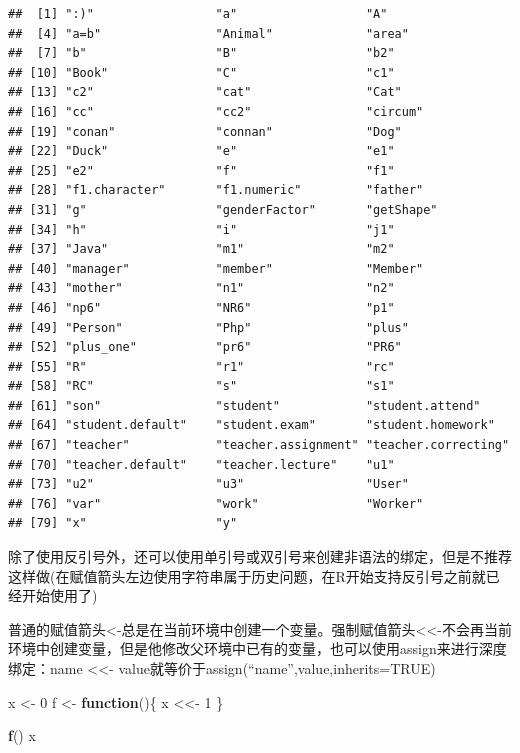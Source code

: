 \documentclass[]{book}
\newenvironment{Shaded}{\begin{snugshade}}{\end{snugshade}}
\newcommand{\KeywordTok}[1]{\textcolor[rgb]{0.13,0.29,0.53}{\textbf{#1}}}
\newcommand{\DecValTok}[1]{\textcolor[rgb]{0.00,0.00,0.81}{#1}}
\newcommand{\StringTok}[1]{\textcolor[rgb]{0.31,0.60,0.02}{#1}}
\newcommand{\ControlFlowTok}[1]{\textcolor[rgb]{0.13,0.29,0.53}{\textbf{#1}}}
\newcommand{\NormalTok}[1]{#1}
\begin{document}
\begin{verbatim}
##  [1] ":)"                 "a"                  "A"                 
##  [4] "a=b"                "Animal"             "area"              
##  [7] "b"                  "B"                  "b2"                
## [10] "Book"               "C"                  "c1"                
## [13] "c2"                 "cat"                "Cat"               
## [16] "cc"                 "cc2"                "circum"            
## [19] "conan"              "connan"             "Dog"               
## [22] "Duck"               "e"                  "e1"                
## [25] "e2"                 "f"                  "f1"                
## [28] "f1.character"       "f1.numeric"         "father"            
## [31] "g"                  "genderFactor"       "getShape"          
## [34] "h"                  "i"                  "j1"                
## [37] "Java"               "m1"                 "m2"                
## [40] "manager"            "member"             "Member"            
## [43] "mother"             "n1"                 "n2"                
## [46] "np6"                "NR6"                "p1"                
## [49] "Person"             "Php"                "plus"              
## [52] "plus_one"           "pr6"                "PR6"               
## [55] "R"                  "r1"                 "rc"                
## [58] "RC"                 "s"                  "s1"                
## [61] "son"                "student"            "student.attend"    
## [64] "student.default"    "student.exam"       "student.homework"  
## [67] "teacher"            "teacher.assignment" "teacher.correcting"
## [70] "teacher.default"    "teacher.lecture"    "u1"                
## [73] "u2"                 "u3"                 "User"              
## [76] "var"                "work"               "Worker"            
## [79] "x"                  "y"
\end{verbatim}

除了使用反引号外，还可以使用单引号或双引号来创建非语法的绑定，但是不推荐这样做(在赋值箭头左边使用字符串属于历史问题，在R开始支持反引号之前就已经开始使用了)

普通的赋值箭头\textless{}-总是在当前环境中创建一个变量。强制赋值箭头\textless{}\textless{}-不会再当前环境中创建变量，但是他修改父环境中已有的变量，也可以使用assign来进行深度绑定：name
\textless{}\textless{}-
value就等价于assign(``name'',value,inherits=TRUE)

\begin{Shaded}
\begin{Highlighting}[]
\NormalTok{x <-}\StringTok{ }\DecValTok{0}
\NormalTok{f <-}\StringTok{ }\ControlFlowTok{function}\NormalTok{()\{}
\NormalTok{  x <<-}\StringTok{ }\DecValTok{1}
\NormalTok{\}}

\KeywordTok{f}\NormalTok{()}
\NormalTok{x}
\end{Highlighting}
\end{Shaded}
\end{document}
